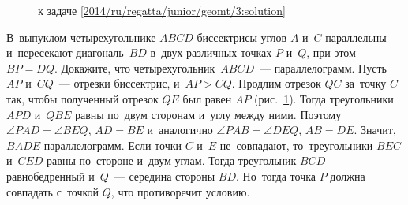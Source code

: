 \ifsolution
\begin{figure}\centering
    \caption{к задаче \ref{2014/ru/regatta/junior/geomt/3:solution}}
    \label{2014/ru/regatta/junior/geomt/3:solution:fig}
\end{figure}%
\fi %

\problem
В~выпуклом четырехугольнике $ABCD$ биссектрисы углов $A$ и~$C$ параллельны
и~пересекают диагональ~$BD$ в~двух различных точках $P$ и~$Q$, при этом
$BP = DQ$.
Докажите, что четырехугольник~$ABCD$~--- параллелограмм.
\solution
\label{2014/ru/regatta/junior/geomt/3:solution}%
Пусть $AP$ и~$CQ$~--- отрезки биссектрис, и~$AP > CQ$.
Продлим отрезок $QC$ за~точку $C$ так, чтобы полученный отрезок $QE$ был
равен $AP$
(рис.~\ref{2014/ru/regatta/junior/geomt/3:solution:fig}).
Тогда треугольники $APD$ и~$QBE$ равны по~двум сторонам и~углу между ними.
Поэтому $\angle PAD = \angle BEQ$, $AD = BE$ и~аналогично
$\angle PAB = \angle DEQ$, $AB = DE$.
Значит, $BADE$ параллелограмм.
Если точки $C$ и~$E$ не~совпадают, то~треугольники $BEC$ и~$CED$ равны
по~стороне и~двум углам.
Тогда треугольник $BCD$ равнобедренный и~$Q$~--- середина стороны $BD$.
Но~тогда точка $P$ должна совпадать с~точкой $Q$, что противоречит условию.
\endproblem

